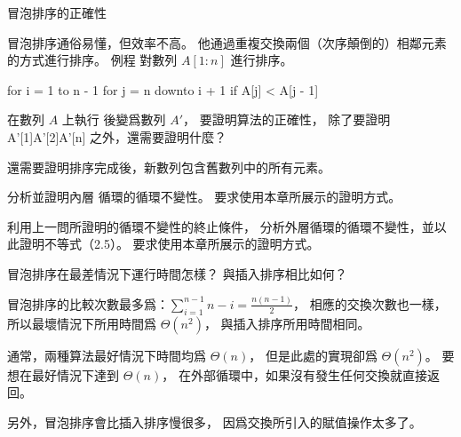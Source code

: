 \startPROBLEM
冒泡排序的正確性

冒泡排序通俗易懂，但效率不高。
他通過重複交換兩個（次序顛倒的）相鄰元素的方式進行排序。
例程  對數列 $A[1:n]$ 進行排序。

\startCLRSCODE
for i = 1 to n - 1
	for j = n downto i + 1
		if A[j] < A[j - 1]
\stopCLRSCODE

\startigBase[a]
\item 在數列 $A$ 上執行  後變爲數列 $A'$，
要證明算法的正確性，
除了要證明
\startformula
A'[1]\le A'[2]\le \cdots \le A'[n]
\stopformula
之外，還需要證明什麼？
\stopigBase

\startANSWER
還需要證明排序完成後，新數列包含舊數列中的所有元素。
\stopANSWER

\startigBase[continue]
\item 分析並證明內層  循環的循環不變性。
要求使用本章所展示的證明方式。
\stopigBase

\startANSWER
{}
\stopANSWER

\startigBase[continue]
\item 利用上一問所證明的循環不變性的終止條件，
分析外層循環的循環不變性，並以此證明不等式（2.5）。
要求使用本章所展示的證明方式。
\stopigBase

\startANSWER
{}
\stopANSWER

\startigBase[continue]
\item 冒泡排序在最差情況下運行時間怎樣？
與插入排序相比如何？
\stopigBase

\startANSWER
冒泡排序的比較次數最多爲：$\sum_{i=1}^{n-1}{n-i} = \frac{n(n - 1)}{2}$，
相應的交換次數也一樣，所以最壞情況下所用時間爲 $\Theta(n^2)$，
與插入排序所用時間相同。

通常，兩種算法最好情況下時間均爲 $\Theta(n)$，
但是此處的實現卻爲 $\Theta(n^2)$。
要想在最好情況下達到 $\Theta(n)$，
在外部循環中，如果沒有發生任何交換就直接返回。

另外，冒泡排序會比插入排序慢很多，
因爲交換所引入的賦值操作太多了。
\stopANSWER

\stopPROBLEM
